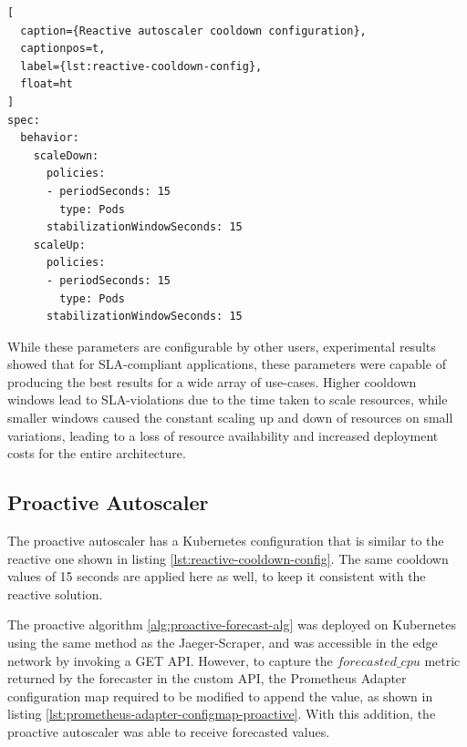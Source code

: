 \begin{lstlisting}[
  caption={Reactive autoscaler cooldown configuration},
  captionpos=t,
  label={lst:reactive-cooldown-config},
  float=ht
]
spec:
  behavior:
    scaleDown:
      policies:
      - periodSeconds: 15
        type: Pods
      stabilizationWindowSeconds: 15
    scaleUp:
      policies:
      - periodSeconds: 15
        type: Pods
      stabilizationWindowSeconds: 15
\end{lstlisting}

While these parameters are configurable by other users, experimental results showed that for SLA-compliant applications, these parameters were capable of producing the best results for a wide array of use-cases. Higher cooldown windows lead to SLA-violations due to the time taken to scale resources, while smaller windows caused the constant scaling up and down of resources on small variations, leading to a loss of resource availability and increased deployment costs for the entire architecture.

\subsection{Proactive Autoscaler}
\label{subsec:ch4-proactive-auto-subsection}



The proactive autoscaler has a Kubernetes configuration that is similar to the reactive one shown in listing \ref{lst:reactive-cooldown-config}. The same cooldown values of 15 seconds are applied here as well, to keep it consistent with the reactive solution.\par

The proactive algorithm \ref{alg:proactive-forecast-alg} was deployed on Kubernetes using the same method as the Jaeger-Scraper, and was accessible in the edge network by invoking a GET API. However, to capture the $forecasted\_cpu$ metric returned by the forecaster in the custom API, the Prometheus Adapter configuration map required to be modified to append the value, as shown in listing \ref{lst:prometheus-adapter-configmap-proactive}. With this addition, the proactive autoscaler was able to receive forecasted values.\par

